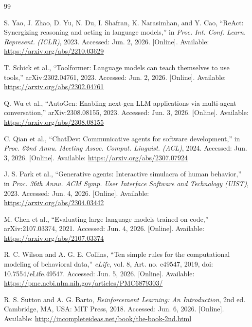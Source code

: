 
\begin{thebibliography}{99}

S. Yao, J. Zhao, D. Yu, N. Du, I. Shafran, K. Narasimhan, and Y. Cao,
``ReAct: Synergizing reasoning and acting in language models,'' in
\emph{Proc. Int. Conf. Learn. Represent. (ICLR)}, 2023. Accessed:
Jun. 2, 2026. [Online]. Available:
\url{https://arxiv.org/abs/2210.03629}

T. Schick et al., ``Toolformer: Language models can teach themselves to use
tools,'' arXiv:2302.04761, 2023. Accessed: Jun. 2, 2026. [Online].
Available: \url{https://arxiv.org/abs/2302.04761}

Q. Wu et al., ``AutoGen: Enabling next-gen LLM applications via multi-agent
conversation,'' arXiv:2308.08155, 2023. Accessed: Jun. 3, 2026.
[Online]. Available: \url{https://arxiv.org/abs/2308.08155}

C. Qian et al., ``ChatDev: Communicative agents for software development,''
in \emph{Proc. 62nd Annu. Meeting Assoc. Comput. Linguist. (ACL)}, 2024.
Accessed: Jun. 3, 2026. [Online]. Available:
\url{https://arxiv.org/abs/2307.07924}

J. S. Park et al., ``Generative agents: Interactive simulacra of human
behavior,'' in \emph{Proc. 36th Annu. ACM Symp. User Interface Software and
Technology (UIST)}, 2023. Accessed: Jun. 4, 2026. [Online]. Available:
\url{https://arxiv.org/abs/2304.03442}

M. Chen et al., ``Evaluating large language models trained on code,''
arXiv:2107.03374, 2021. Accessed: Jun. 4, 2026. [Online]. Available:
\url{https://arxiv.org/abs/2107.03374}

R. C. Wilson and A. G. E. Collins, ``Ten simple rules for the computational
modeling of behavioral data,'' \emph{eLife}, vol. 8, Art. no. e49547,
2019, doi: 10.7554/eLife.49547. Accessed: Jun. 5, 2026. [Online].
Available: \url{https://pmc.ncbi.nlm.nih.gov/articles/PMC6879303/}

R. S. Sutton and A. G. Barto, \emph{Reinforcement Learning: An
Introduction}, 2nd ed. Cambridge, MA, USA: MIT Press, 2018. Accessed:
Jun. 6, 2026. [Online]. Available:
\url{http://incompleteideas.net/book/the-book-2nd.html}


\end{thebibliography}
